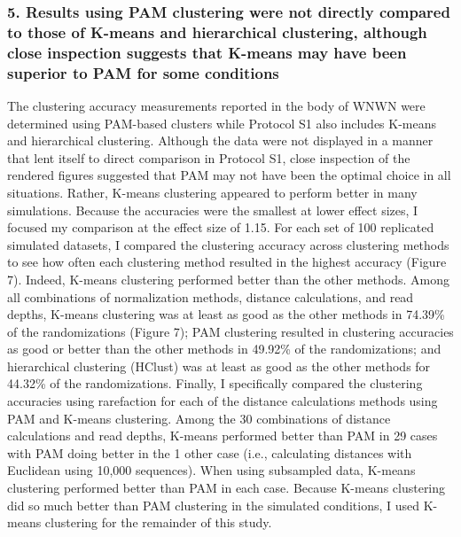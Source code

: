 \documentclass[
]{article}
\begin{document}
\hypertarget{results-using-pam-clustering-were-not-directly-compared-to-those-of-k-means-and-hierarchical-clustering-although-close-inspection-suggests-that-k-means-may-have-been-superior-to-pam-for-some-conditions}{%
\subsubsection{5. Results using PAM clustering were not directly
compared to those of K-means and hierarchical clustering, although close
inspection suggests that K-means may have been superior to PAM for some
conditions}\label{results-using-pam-clustering-were-not-directly-compared-to-those-of-k-means-and-hierarchical-clustering-although-close-inspection-suggests-that-k-means-may-have-been-superior-to-pam-for-some-conditions}}

The clustering accuracy measurements reported in the body of WNWN were
determined using PAM-based clusters while Protocol S1 also includes
K-means and hierarchical clustering. Although the data were not
displayed in a manner that lent itself to direct comparison in Protocol
S1, close inspection of the rendered figures suggested that PAM may not
have been the optimal choice in all situations. Rather, K-means
clustering appeared to perform better in many simulations. Because the
accuracies were the smallest at lower effect sizes, I focused my
comparison at the effect size of 1.15. For each set of 100 replicated
simulated datasets, I compared the clustering accuracy across clustering
methods to see how often each clustering method resulted in the highest
accuracy (Figure 7). Indeed, K-means clustering performed better than
the other methods. Among all combinations of normalization methods,
distance calculations, and read depths, K-means clustering was at least
as good as the other methods in 74.39\% of the randomizations (Figure
7); PAM clustering resulted in clustering accuracies as good or better
than the other methods in 49.92\% of the randomizations; and
hierarchical clustering (HClust) was at least as good as the other
methods for 44.32\% of the randomizations. Finally, I specifically
compared the clustering accuracies using rarefaction for each of the
distance calculations methods using PAM and K-means clustering. Among
the 30 combinations of distance calculations and read depths, K-means
performed better than PAM in 29 cases with PAM doing better in the 1
other case (i.e., calculating distances with Euclidean using 10,000
sequences). When using subsampled data, K-means clustering performed
better than PAM in each case. Because K-means clustering did so much
better than PAM clustering in the simulated conditions, I used K-means
clustering for the remainder of this study.
\end{document}
